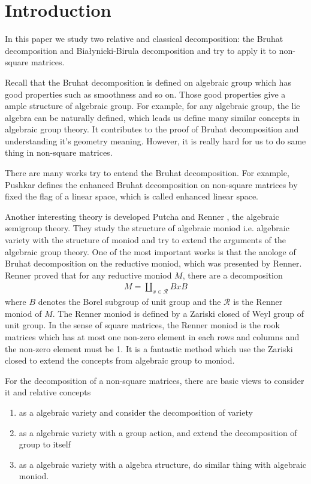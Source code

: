 \documentclass[10pt,UTF8]{article}
\theoremstyle{definition}
\begin{document}
\setcounter{page}{1}
\section{Introduction}

In this paper we study two relative and classical decomposition: the Bruhat decomposition
and Białynicki-Birula decomposition and try to apply it to non-square matrices.


Recall that the Bruhat decomposition is defined on algebraic group which has good properties such as smoothness and 
so on. Those good properties give a ample structure of algebraic group. For example, for any algebraic group, the lie algebra can 
be naturally defined, which leads us define many similar concepts in algebraic group theory. 
It contributes to the proof of Bruhat decomposition and understanding it's geometry meaning.
However, it is really hard for us to do same thing in non-square matrices. 

There are many works try to entend the Bruhat decomposition. For example, Pushkar\cite{pushkar2020enhanced} 
defines the enhanced Bruhat decomposition on non-square matrices by fixed the flag of a linear space, which is 
called enhanced linear space.

Another interesting theory is developed Putcha and Renner \cite{putcha1988linear,renner2005linear}, the algebraic semigroup theory.
They study the structure of algebraic moniod i.e. algebraic variety with the structure of moniod and try to extend the arguments of the 
algebraic group theory. One of the most important works is that the anologe of Bruhat decomposition on the reductive moniod, which was
presented by Renner\cite{renner1986analogue}. Renner proved that for any reductive moniod $M$, there are a decomposition
\begin{align*}
  M = \coprod_{x\in\mathcal{R}} BxB
\end{align*}
where $B$ denotes the Borel subgroup of unit group and the $\mathcal{R}$ is the Renner moniod of $M$. 
The Renner moniod is defined by a Zariski closed of Weyl group of unit group. In the sense of square matrices,
the Renner moniod is the rook matrices which has at most one non-zero element in each rows and columns and the non-zero 
element must be 1. It is a fantastic method which use the Zariski closed to extend the concepts from algebraic group to
moniod. 

For the decomposition of a non-square matrices, there are basic views to consider it and relative concepts
\begin{enumerate}
  \item as a algebraic variety and consider the decomposition of variety
  \item as a algebraic variety with a group action, and extend the decomposition of group to itself
  \item as a algebraic variety with a algebra structure, do similar thing with algebraic moniod.
\end{enumerate}
\end{document}
